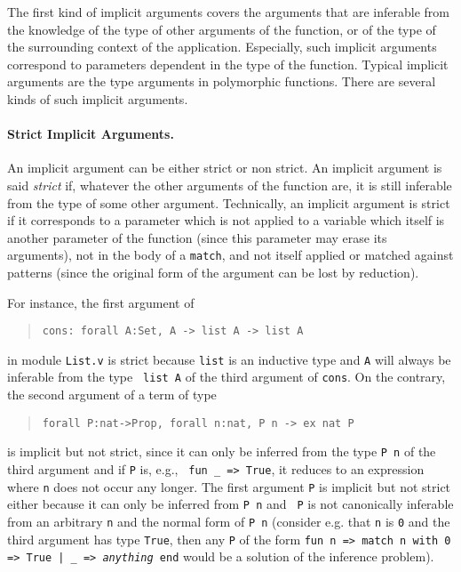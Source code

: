 The first kind of implicit arguments covers the arguments that are
inferable from the knowledge of the type of other arguments of the
function, or of the type of the surrounding context of the
application.  Especially, such implicit arguments correspond to 
parameters dependent in the type of the function. Typical implicit
arguments are the type arguments in polymorphic functions.  
There are several kinds of such implicit arguments.

\paragraph{Strict Implicit Arguments.} 
An implicit argument can be either strict or non strict. An implicit
argument is said {\em strict} if, whatever the other arguments of the
function are, it is still inferable from the type of some other
argument. Technically, an implicit argument is strict if it
corresponds to a parameter which is not applied to a variable which
itself is another parameter of the function (since this parameter
may erase its arguments), not in the body of a {\tt match}, and not
itself applied or matched against patterns (since the original
form of the argument can be lost by reduction).

For instance, the first argument of
\begin{quote}
\verb|cons: forall A:Set, A -> list A -> list A|
\end{quote}
in module {\tt List.v} is strict because {\tt list} is an inductive
type and {\tt A} will always be inferable from the type {\tt
list A} of the third argument of {\tt cons}.
On the contrary, the second argument of a term of type 
\begin{quote}
\verb|forall P:nat->Prop, forall n:nat, P n -> ex nat P|
\end{quote}
is implicit but not strict, since it can only be inferred from the
type {\tt P n} of the third argument and if {\tt P} is, e.g., {\tt
fun \_ => True}, it reduces to an expression where {\tt n} does not
occur any longer. The first argument {\tt P} is implicit but not
strict either because it can only be inferred from {\tt P n} and {\tt
P} is not canonically inferable from an arbitrary {\tt n} and the
normal form of {\tt P n} (consider e.g. that {\tt n} is {\tt 0} and
the third argument has type {\tt True}, then any {\tt P} of the form
{\tt fun n => match n with 0 => True | \_ => \mbox{\em anything} end} would
be a solution of the inference problem).


